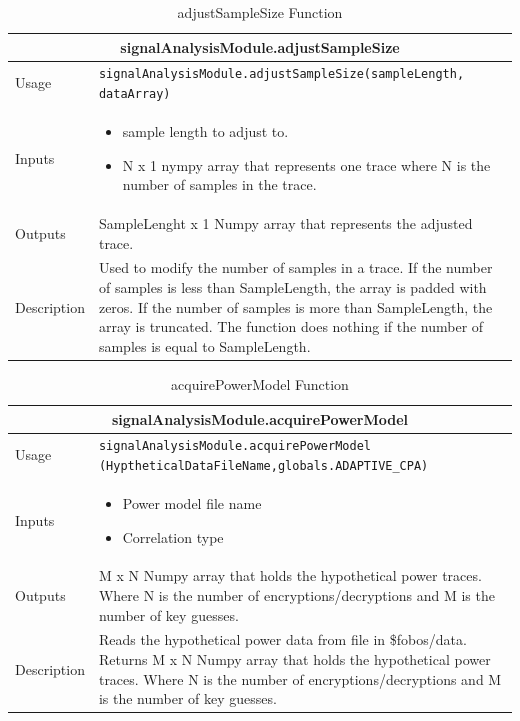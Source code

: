 \documentclass{llncs}
\numberwithin{algorithm}{chapter}
\begin{document}
\begin{table}[H]
\caption{adjustSampleSize Function}
\begin{tabular}{ |p{2cm}||p{11cm}|  }
 \hline
 \multicolumn{2}{|c|}{\cellcolor{teal}\textbf{signalAnalysisModule.adjustSampleSize}} \\
 \hline
 Usage & \texttt{signalAnalysisModule.adjustSampleSize(sampleLength, dataArray)}\\ \hline
 Inputs & \begin{itemize} \item sample length to adjust to. 		   
         \item N x 1 nympy array that represents one trace where N is the number of samples in the trace. 
		\end{itemize}\\ \hline
 Outputs & SampleLenght x 1 Numpy array that represents the adjusted trace. \\ \hline
 Description & Used to modify the number of samples in a trace. If the number of samples is less than SampleLength, the array is padded with zeros. If the number of samples is more than SampleLength, the array is truncated. The function does nothing if the number of samples is equal to SampleLength.
 \\ \hline
\end{tabular}
\end{table}

\begin{table}[H]
\caption{acquirePowerModel Function}
\begin{tabular}{ |p{2cm}||p{11cm}|  }
 \hline
 \multicolumn{2}{|c|}{\cellcolor{teal}\textbf{signalAnalysisModule.acquirePowerModel}} \\
 \hline
 Usage & \texttt{signalAnalysisModule.acquirePowerModel
 (HyptheticalDataFileName,globals.ADAPTIVE\_CPA)}\\ \hline
 Inputs & \begin{itemize}
 			\item Power model file name
 			\item  Correlation type 
 			\end{itemize}
 			\\ \hline
 Outputs & M x N Numpy array that holds the hypothetical power traces. Where N is the number of encryptions/decryptions and M is the number of key guesses. \\ \hline
 Description & Reads the hypothetical power data from file in \$fobos/data. Returns M x N Numpy array that holds the hypothetical power traces. Where N is the number of encryptions/decryptions and M is the number of key guesses.
 \\ \hline
\end{tabular}
\end{table}
\end{document}
